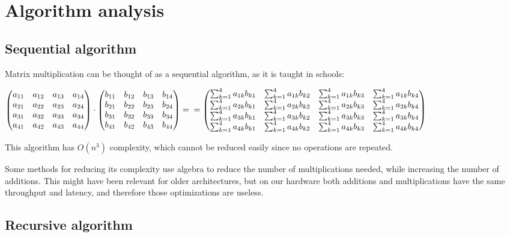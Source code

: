 \chapter{Algorithm analysis}


\section{Sequential algorithm}

Matrix multiplication can be thought of as a sequential algorithm, as it is
taught in schools:

$
\begin{pmatrix}
    a_{11} & a_{12} & a_{13} & a_{14} \\
    a_{21} & a_{22} & a_{23} & a_{24} \\
    a_{31} & a_{32} & a_{33} & a_{34} \\
    a_{41} & a_{42} & a_{43} & a_{44}
\end{pmatrix}
\cdot
\begin{pmatrix}
    b_{11} & b_{12} & b_{13} & b_{14} \\
    b_{21} & b_{22} & b_{23} & b_{24} \\
    b_{31} & b_{32} & b_{33} & b_{34} \\
    b_{41} & b_{42} & b_{43} & b_{44}
\end{pmatrix}
= \\
=
\begin{pmatrix}
    \sum_{k=1}^{4} a_{1k}b_{k1} & \sum_{k=1}^{4} a_{1k}b_{k2} & \sum_{k=1}^{4} a_{1k}b_{k3} & \sum_{k=1}^{4} a_{1k}b_{k4} \\
    \sum_{k=1}^{4} a_{2k}b_{k1} & \sum_{k=1}^{4} a_{2k}b_{k2} & \sum_{k=1}^{4} a_{2k}b_{k3} & \sum_{k=1}^{4} a_{2k}b_{k4} \\
    \sum_{k=1}^{4} a_{3k}b_{k1} & \sum_{k=1}^{4} a_{3k}b_{k2} & \sum_{k=1}^{4} a_{3k}b_{k3} & \sum_{k=1}^{4} a_{3k}b_{k4} \\
    \sum_{k=1}^{4} a_{4k}b_{k1} & \sum_{k=1}^{4} a_{4k}b_{k2} & \sum_{k=1}^{4} a_{4k}b_{k3} & \sum_{k=1}^{4} a_{4k}b_{k4}
\end{pmatrix}
$

This algorithm has $O(n^3)$ complexity, which cannot be reduced easily since no
operations are repeated.

    Some methods for reducing its complexity use algebra to reduce the number of
multiplications needed, while increasing the number of additions. This might
have been relevant for older architectures, but on our hardware both additions
and multiplications have the same throughput and latency, and therefore those
optimizations are useless.



\section{Recursive algorithm}
